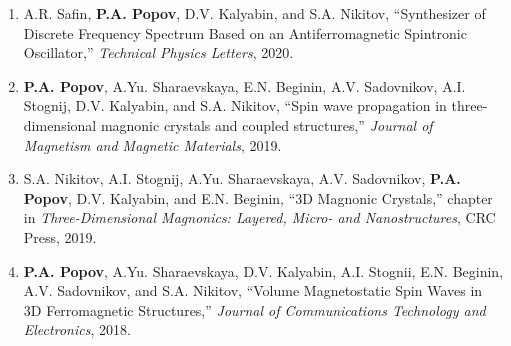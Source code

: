 \documentclass[11pt,a4paper]{article}
\newcommand{\me}[1]{\textbf{#1}} %
\begin{document}
{\begin{enumerate}[leftmargin=*,itemsep=1pt,label=\arabic*.]
\item A.R. Safin, \me{P.A. Popov}, D.V. Kalyabin, and S.A. Nikitov, ``Synthesizer of Discrete Frequency Spectrum Based on an Antiferromagnetic Spintronic Oscillator,'' \textit{Technical Physics Letters}, 2020.

\item \me{P.A. Popov}, A.Yu. Sharaevskaya, E.N. Beginin, A.V. Sadovnikov, A.I. Stognij, D.V. Kalyabin, and S.A. Nikitov, ``Spin wave propagation in three-dimensional magnonic crystals and coupled structures,'' \textit{Journal of Magnetism and Magnetic Materials}, 2019.

\item S.A. Nikitov, A.I. Stognij, A.Yu. Sharaevskaya, A.V. Sadovnikov, \me{P.A. Popov}, D.V. Kalyabin, and E.N. Beginin, ``3D Magnonic Crystals,'' chapter in \textit{Three-Dimensional Magnonics: Layered, Micro- and Nanostructures}, CRC Press, 2019.

\item \me{P.A. Popov}, A.Yu. Sharaevskaya, D.V. Kalyabin, A.I. Stognii, E.N. Beginin, A.V. Sadovnikov, and S.A. Nikitov, ``Volume Magnetostatic Spin Waves in 3D Ferromagnetic Structures,'' \textit{Journal of Communications Technology and Electronics}, 2018.

\end{enumerate}
}
\end{document}

